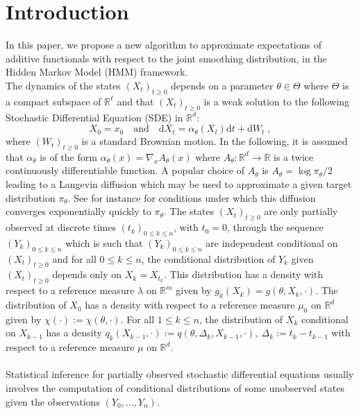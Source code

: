 \documentclass[12pt]{article}
\newcommand{\rmd}{\mathrm{d}}
\newcommand{\eqsp}{\;}
\newcommand{\1}{\mathrm{1}}
\newcommand{\qk}{q_{k}}
\begin{document}
\section{Introduction}
In this paper, we propose a new algorithm to approximate expectations of additive functionals with respect to the joint smoothing distribution, in the Hidden Markov Model (HMM) framework.\\
The dynamics of the states $(X_t)_{t\ge 0}$ depends on a parameter $\theta\in \Theta$ where $\Theta$ is a compact subspace of $\mathbb{R}^{\ell}$ and that $(X_t)_{t\ge 0}$ is a weak solution to the following Stochastic Differential Equation (SDE) in $\mathbb{R}^d$:
\begin{equation}
\label{eq:target:sde}
X_0 = x_0\quad\mbox{and}\quad \rmd X_t = \alpha_{\theta}(X_t)\rmd t + \rmd W_t\eqsp,
\end{equation}
where $(W_t)_{t\ge 0}$ is a standard Brownian motion. In the following, it is assumed that $\alpha_{\theta}$ is of the form $\alpha_{\theta}(x) = \nabla_x A_{\theta}(x)$ where $A_{\theta}: \mathbb{R}^d \to \mathbb{R}$ is a twice continuously differentiable function. 
A popular choice of $A_{\theta}$  is $A_{\theta} = \log \pi_{\theta}/2$ leading to a Langevin diffusion which may be used to approximate a given target distribution $\pi_{\theta}$. See for instance \cite{roberts:tweedie:1996} for conditions under which this diffusion converges exponentially quickly to $\pi_{\theta}$. 
The states $(X_t)_{t\ge 0}$ are only partially observed at discrete times $(t_k)_{0\le k \le n}$, with $t_0=0$, through the sequence $(Y_k)_{0\le k\le n}$ which is such that $(Y_k)_{0\le k\le n}$ are independent conditional on $(X_t)_{t\ge 0}$ and for all $0\le k\le n$, the conditional distribution of $Y_k$ given $(X_t)_{t\ge 0}$ depends only on $X_k = X_{t_k}$. 
This distribution has a density with respect to a reference measure $\lambda$ on $\mathbb{R}^m$ given by $g_k(X_k) = g(\theta,X_k,\cdot)$. 
The distribution of $X_0$ has a density with respect to a reference measure $\mu_0$ on $\mathbb{R}^d$ given by $\chi(\cdot):=\chi(\theta,\cdot)$.
For all $1\le k \le n$, the distribution of $X_{k} $ conditional on $X_{k-1}$ has a density $\qk(X_{k-1},\cdot) :=q(\theta,\Delta_k,X_{k-1},\cdot),~\Delta_k:=t_k-t_{k-1}$ with respect to a reference measure $\mu$ on $\mathbb{R}^d$.\\
\\
Statistical inference for partially observed stochastic differential equations usually involves the computation of conditional distributions of some unobserved states given the observations $(Y_0,\ldots,Y_n)$. 
\end{document}
